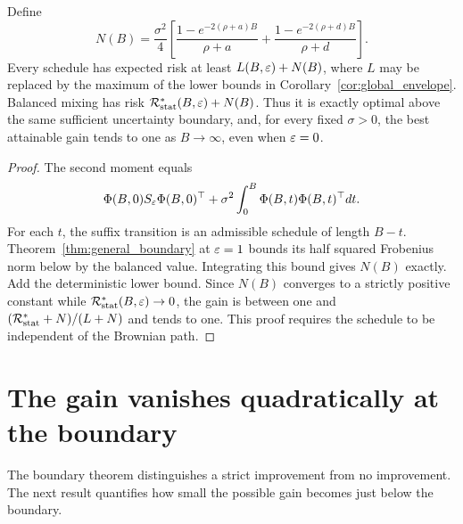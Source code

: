 \begin{proposition}\label{prop:diffusion}
Define
\[
 N(B)=\frac{\sigma^2}{4}\left[
 \frac{1-e^{-2(\rho+a)B}}{\rho+a}
 +\frac{1-e^{-2(\rho+d)B}}{\rho+d}\right].
\]
Every schedule has expected risk at least $L(B,\varepsilon)+N(B)$, where $L$ may be replaced by the maximum of the lower bounds in Corollary~\ref{cor:global_envelope}. Balanced mixing has risk $\mathcal R_{\mathrm{stat}}^*(B,\varepsilon)+N(B)$. Thus it is exactly optimal above the same sufficient uncertainty boundary, and, for every fixed $\sigma>0$, the best attainable gain tends to one as $B\to\infty$, even when $\varepsilon=0$.
\end{proposition}
\begin{proof}
The second moment equals
\[
 \Phi(B,0)S_\varepsilon\Phi(B,0)^\top
 +\sigma^2\int_0^B\Phi(B,t)\Phi(B,t)^\top dt.
\]
For each $t$, the suffix transition is an admissible schedule of length $B-t$. Theorem~\ref{thm:general_boundary} at $\varepsilon=1$ bounds its half squared Frobenius norm below by the balanced value. Integrating this bound gives $N(B)$ exactly. Add the deterministic lower bound. Since $N(B)$ converges to a strictly positive constant while $\mathcal R_{\mathrm{stat}}^*(B,\varepsilon)\to0$, the gain is between one and $(\mathcal R_{\mathrm{stat}}^*+N)/(L+N)$ and tends to one. This proof requires the schedule to be independent of the Brownian path.
\end{proof}

\section{The gain vanishes quadratically at the boundary}\label{app:near_boundary}
The boundary theorem distinguishes a strict improvement from no improvement. The next result quantifies how small the possible gain becomes just below the boundary.


